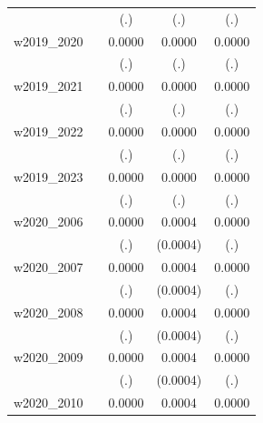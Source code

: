 \begin{table}[htbp]
\begin{tabular}{l*{4}{c}}
            &                     &         (.)         &         (.)         &         (.)         \\
[1em]
w2019\_2020  &                     &      0.0000         &      0.0000         &      0.0000         \\
            &                     &         (.)         &         (.)         &         (.)         \\
[1em]
w2019\_2021  &                     &      0.0000         &      0.0000         &      0.0000         \\
            &                     &         (.)         &         (.)         &         (.)         \\
[1em]
w2019\_2022  &                     &      0.0000         &      0.0000         &      0.0000         \\
            &                     &         (.)         &         (.)         &         (.)         \\
[1em]
w2019\_2023  &                     &      0.0000         &      0.0000         &      0.0000         \\
            &                     &         (.)         &         (.)         &         (.)         \\
[1em]
w2020\_2006  &                     &      0.0000         &      0.0004         &      0.0000         \\
            &                     &         (.)         &    (0.0004)         &         (.)         \\
[1em]
w2020\_2007  &                     &      0.0000         &      0.0004         &      0.0000         \\
            &                     &         (.)         &    (0.0004)         &         (.)         \\
[1em]
w2020\_2008  &                     &      0.0000         &      0.0004         &      0.0000         \\
            &                     &         (.)         &    (0.0004)         &         (.)         \\
[1em]
w2020\_2009  &                     &      0.0000         &      0.0004         &      0.0000         \\
            &                     &         (.)         &    (0.0004)         &         (.)         \\
[1em]
w2020\_2010  &                     &      0.0000         &      0.0004         &      0.0000         \\

\end{tabular}
\end{table}
